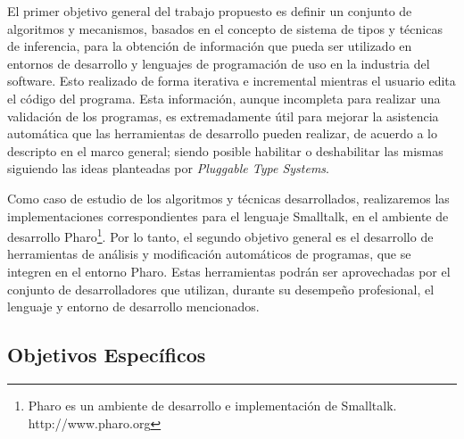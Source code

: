 \documentclass[a4paper,10pt]{article}
\begin{document}
El primer objetivo general del trabajo propuesto es definir un conjunto de algoritmos y mecanismos, basados en el concepto de sistema de tipos y técnicas de inferencia, para la obtención de información que pueda ser utilizado en entornos de desarrollo y lenguajes de programación de uso en la industria del software. Esto realizado de forma iterativa e incremental mientras el usuario edita el código del programa.
Esta información, aunque incompleta para realizar una validación de los programas, es extremadamente útil para mejorar la asistencia automática que las herramientas de desarrollo pueden realizar, de acuerdo a lo descripto en el marco general; siendo posible habilitar o deshabilitar las mismas siguiendo las ideas planteadas por \emph{Pluggable Type Systems}.

Como caso de estudio de los algoritmos y técnicas desarrollados, realizaremos las implementaciones correspondientes para el lenguaje Smalltalk, en el ambiente de desarrollo Pharo\footnote{Pharo es un ambiente de desarrollo e implementación de Smalltalk. http://www.pharo.org }.
Por lo tanto, el segundo objetivo general es el desarrollo de herramientas de análisis y modificación automáticos de programas, que se integren en el entorno Pharo. Estas herramientas podrán ser aprovechadas por el conjunto de desarrolladores que utilizan, durante su desempeño profesional, el lenguaje y entorno de desarrollo mencionados.

\subsection{Objetivos Específicos}
\end{document}
